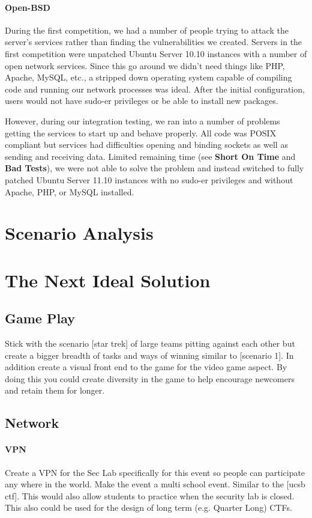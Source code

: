 \documentclass[10pt]{article}
\begin{document}
\paragraph*{Open-BSD} During the first competition, we had a
number of people trying to attack the server's services rather than finding the vulnerabilities
we created. Servers in the first competition were unpatched Ubuntu Server 10.10
instances with a number of open network services. Since this go around we didn't
need things like PHP, Apache, MySQL, etc., a stripped down operating system
capable of compiling code and running our network processes was ideal. After the
initial configuration, users would not have sudo-er privileges or be able to
install new packages. 

However, during our integration testing, we ran into a number of problems
getting the services to start up and behave properly. All code was POSIX
compliant but services had difficulties opening and binding sockets as well as
sending and receiving data. Limited remaining time (see \textbf{Short On Time}
and \textbf{Bad Tests}), we were not able to solve the problem and instead
switched to fully patched Ubuntu Server 11.10 instances with no sudo-er
privileges and without Apache, PHP, or MySQL installed. 

\section{Scenario Analysis}


\section{The Next Ideal Solution}

\subsection{Game Play}
Stick with the scenario [star trek] of large teams pitting against each other 
but create a bigger breadth of tasks and ways of winning similar to [scenario 1].
In addition create a visual front end to the game for the video game aspect.
By doing this you could create diversity in the game to help encourage newcomers
and retain them for longer.

\subsection{Network}

\paragraph{VPN}
Create a VPN for the Sec Lab specifically for this event so people can participate any where
in the world. Make the event a multi school event. Similar to the [ucsb ctf]. This would
also allow students to practice when the security lab is closed. This also could be used
for the design of long term (e.g. Quarter Long) CTFs.
\end{document}
